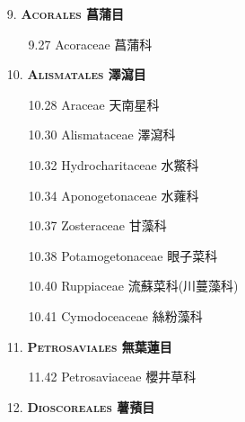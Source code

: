 \begin{enumerate}
  \item[9. ] \textbf{\textsc{Acorales} 菖蒲目}   
    \begin{enumerate}
      \item[9.27] Acoraceae 菖蒲科     
        
    \end{enumerate}
  \item[10. ] \textbf{\textsc{Alismatales} 澤瀉目}   
    \begin{enumerate}
      \item[10.28] Araceae 天南星科     
        
      \item[10.30] Alismataceae 澤瀉科     
        
      \item[10.32] Hydrocharitaceae 水鱉科     
        
      \item[10.34] Aponogetonaceae 水蕹科     
        
      \item[10.37] Zosteraceae 甘藻科     
        
      \item[10.38] Potamogetonaceae 眼子菜科     
        
      \item[10.40] Ruppiaceae 流蘇菜科(川蔓藻科)     
        
      \item[10.41] Cymodoceaceae 絲粉藻科     
        
    \end{enumerate}
  \item[11. ] \textbf{\textsc{Petrosaviales} 無葉蓮目}   
    \begin{enumerate}
      \item[11.42] Petrosaviaceae 櫻井草科     
        
    \end{enumerate}
  \item[12. ] \textbf{\textsc{Dioscoreales} 薯蕷目}   

\end{enumerate}
